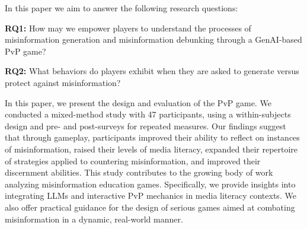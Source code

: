 In this paper we aim to answer the following research questions: 

\textbf{RQ1:}  
How may we empower players to understand the processes of misinformation generation and misinformation debunking through a GenAI-based PvP game?

\textbf{RQ2:} 
What behaviors do players exhibit when they are asked to generate versus protect against misinformation?
 
In this paper, we present the design and evaluation of the PvP game. We conducted a mixed-method study with 47 participants, using a within-subjects design and pre- and post-surveys for repeated measures. Our findings suggest that through gameplay, participants improved their ability to reflect on instances of misinformation, raised their levels of media literacy, expanded their repertoire of strategies applied to countering misinformation, and improved their discernment abilities. This study contributes to the growing body of work analyzing misinformation education games. Specifically, we provide insights into integrating LLMs and interactive PvP mechanics in media literacy contexts. We also offer practical guidance for the design of serious games aimed at combating misinformation in a dynamic, real-world manner.



